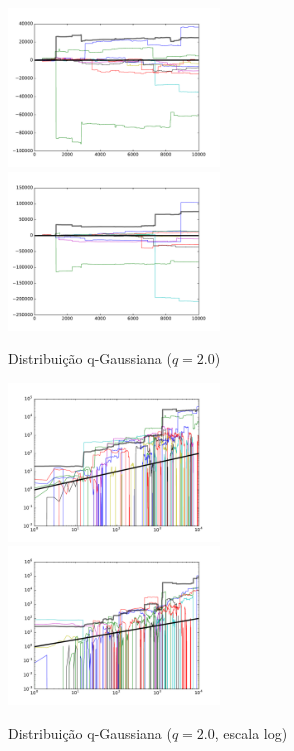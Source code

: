 \documentclass[12pt,a4paper,hidelinks]{article}
\begin{document}
  \pagebreak

  \begin{figure}[htb]
    \caption{Distribuição q-Gaussiana ($q = 2.0$)}
    \includegraphics[width=0.5\textwidth]{figures/2_0__0.pdf}
    \includegraphics[width=0.5\textwidth]{figures/2_0__1.pdf}
    \label{fig:randomwalk_q-gaussian_2.0}
  \end{figure}

  \begin{figure}[htb]
    \caption{Distribuição q-Gaussiana ($q = 2.0$, escala log)}
    \includegraphics[width=0.5\textwidth]{figures/2_0__0__log.pdf}
    \includegraphics[width=0.5\textwidth]{figures/2_0__1__log.pdf}
    \label{fig:randomwalk_q-gaussian_2.0_log}
  \end{figure}
\end{document}
